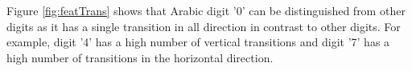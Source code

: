\documentclass[times, 10pt,twocolumn]{article}
\begin{document}
Figure \ref{fig:featTrans} shows that Arabic digit '0' can be distinguished from other digits as it has a single transition in all direction in contrast to other digits. For example, digit  '4' has a high number of  vertical transitions and digit '7' has a high number of transitions in the horizontal direction.



\end{document}
